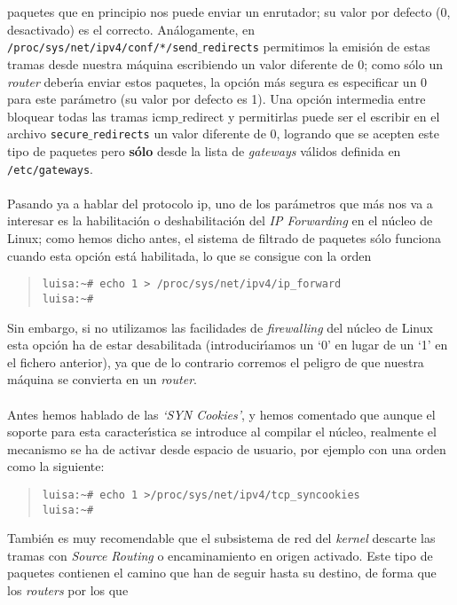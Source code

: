 paquetes que en principio nos puede enviar un enrutador; su valor por defecto
(0, desactivado) es el correcto. An\'alogamente, en {\tt 
/proc/sys/net/ipv4/conf/*/send$\_$redirects} permitimos la emisi\'on de estas
tramas desde nuestra m\'aquina escribiendo un valor diferente de 0; como s\'olo
un {\it router} deber\'{\i}a enviar estos paquetes, la opci\'on m\'as segura 
es especificar un 0 para este par\'ametro (su valor por defecto es 1). Una
opci\'on intermedia entre bloquear todas las tramas {\sc icmp$\_$redirect} y
permitirlas puede ser el escribir en el archivo {\tt secure$\_$redirects} un
valor diferente de 0, logrando que se acepten este tipo de paquetes pero {\bf
s\'olo} desde la lista de {\it gateways} v\'alidos definida en {\tt 
/etc/gateways}.\\
\\Pasando ya a hablar del protocolo {\sc ip}, uno de los par\'ametros que m\'as 
nos va a interesar es la habilitaci\'on o
deshabilitaci\'on del {\it IP Forwarding} en el n\'ucleo de Linux; como hemos
dicho antes, el sistema de filtrado de paquetes s\'olo funciona cuando esta
opci\'on est\'a habilitada, lo que se consigue con la orden
\begin{quote}
\begin{verbatim}
luisa:~# echo 1 > /proc/sys/net/ipv4/ip_forward
luisa:~# 
\end{verbatim}
\end{quote}
Sin embargo, si no utilizamos las facilidades de {\it firewalling} del n\'ucleo
de Linux esta opci\'on ha de estar desabilitada (introducir\'{\i}amos un `0' en
lugar de un `1' en el fichero anterior), ya que de lo contrario corremos el
peligro de que nuestra m\'aquina se convierta en un {\it router}.\\
\\Antes hemos hablado de las {\it `SYN Cookies'}, y hemos comentado que aunque
el soporte para esta caracter\'{\i}stica se introduce al compilar el n\'ucleo,
realmente el mecanismo se ha de activar desde espacio de usuario, por ejemplo
con una orden como la siguiente:
\begin{quote}
\begin{verbatim}
luisa:~# echo 1 >/proc/sys/net/ipv4/tcp_syncookies
luisa:~# 
\end{verbatim}
\end{quote}
Tambi\'en es muy recomendable que el
subsistema de red del {\it kernel} descarte las tramas con {\it Source Routing}
o encaminamiento en origen activado. Este tipo de paquetes contienen el camino
que han de seguir hasta su destino, de forma que los {\it routers} por los que

